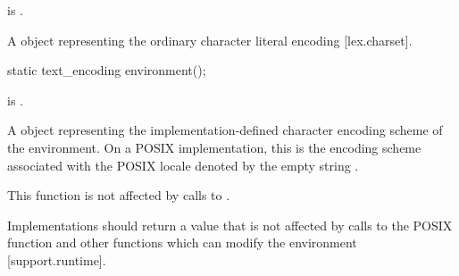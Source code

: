 \documentclass{wg21}
\begin{document}
\begin{addedblock}
\begin{itemdescr}
\mandates {} is .

\returns A  object representing the ordinary character literal encoding [lex.charset].

\end{itemdescr}

%
%
%
%
%



\begin{itemdecl}
static text_encoding environment();
\end{itemdecl}


\begin{itemdescr}

\mandates {} is .

\returns A  object representing the implementation-defined character encoding scheme of the environment.
On a POSIX implementation, this is the encoding scheme associated with the POSIX locale denoted by the empty string .

\begin{note}
    This function is not affected by calls to .
\end{note}

\recommended Implementations should return a value that is not affected by calls to the POSIX function 
and other functions which can modify the environment [support.runtime].


\end{itemdescr}
\end{addedblock}
\end{document}
